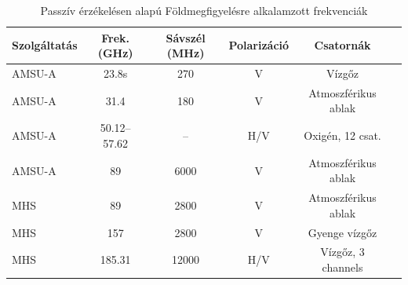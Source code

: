 \documentclass[a4paper,11pt]{article}
\begin{document}
\begin{table}[H]
  \centering
  \caption{Passzív érzékelésen alapú Földmegfigyelésre alkalamzott frekvenciák}
  \label{tab:noaa19-sensing}
  \begin{tabular}{|l|c|c|c|c|l|}
    \hline
    \textbf{Szolgáltatás} & \textbf{Frek. (GHz)} & \textbf{Sávszél (MHz)} & \textbf{Polarizáció} & \textbf{Csatornák}  \\ \hline
    AMSU-A                & 23.8s                & 270                    & V                    & Vízgőz              \\ \hline
    AMSU-A                & 31.4                 & 180                    & V                    & Atmoszférikus ablak \\ \hline
    AMSU-A                & 50.12–57.62          & –                      & H/V                  & Oxigén, 12 csat.    \\ \hline
    AMSU-A                & 89                   & 6000                   & V                    & Atmoszférikus ablak \\ \hline
    MHS                   & 89                   & 2800                   & V                    & Atmoszférikus ablak \\ \hline
    MHS                   & 157                  & 2800                   & V                    & Gyenge vízgőz       \\ \hline
    MHS                   & 185.31               & 12000                  & H/V                  & Vízgőz, 3 channels  \\ \hline
  \end{tabular}
\end{table}
\end{document}
